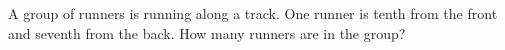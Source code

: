 A group of runners is running along a track. One runner is tenth from the front and seventh from the back. How many runners are in the group?
